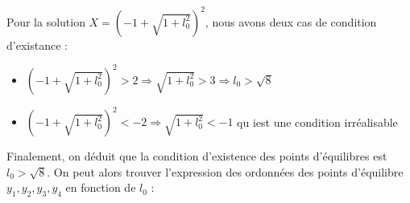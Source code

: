 \documentclass[10pt,a4paper]{article}
\begin{document}

Pour la solution $X=(-1+\sqrt{1+l_0^2})^2$, nous avons deux cas de condition d'existance :\\
\begin{itemize}
\item $(-1+\sqrt{1+l_0^2})^2 > 2 \Rightarrow \sqrt{1+l_0^2}>3\Rightarrow l_0 > \sqrt{8}$
\item $(-1+\sqrt{1+l_0^2})^2 < -2 \Rightarrow \sqrt{1+l_0^2}<-1$ qu iest une condition irréalisable
\end{itemize}
Finalement, on déduit que la condition d'existence des points d'équilibres est $l_0>\sqrt{8}$.
On peut alors trouver l'expression des ordonnées des points d'équilibre $y_1,y_2,y_3,y_4$ en fonction de $l_0$ :\\
\end{document}
